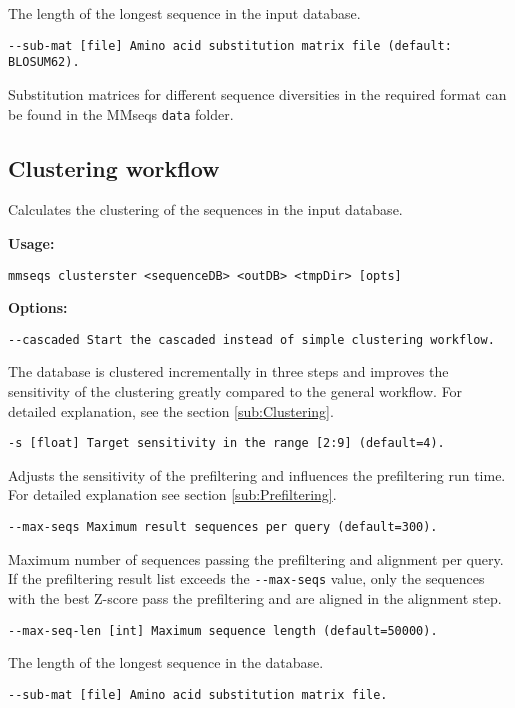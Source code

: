 \documentclass[11pt,a4paper]{report}
\begin{document}
The length of the longest sequence in the input database.

\texttt{\small -{}-sub-mat {[}file{]} Amino acid substitution matrix
file (default: BLOSUM62).}{\small \par}

Substitution matrices for different sequence diversities in the required
format can be found in the MMseqs \texttt{data} folder.


\subsection{Clustering workflow\label{sub:Clustering-workflow}}

Calculates the clustering of the sequences in the input database. 

\textbf{Usage:}

\texttt{mmseqs clusterster <sequenceDB> <outDB> <tmpDir> {[}opts{]}}

\textbf{Options:}

\texttt{\small -{}-cascaded Start the cascaded instead of simple clustering
workflow.}{\small \par}

The database is clustered incrementally in three steps and improves
the sensitivity of the clustering greatly compared to the general
workflow. For detailed explanation, see the section \ref{sub:Clustering}.

\texttt{\small -s {[}float{]} Target sensitivity in the range {[}2:9{]}
(default=4).}{\small \par}

Adjusts the sensitivity of the prefiltering and influences the prefiltering
run time. For detailed explanation see section \ref{sub:Prefiltering}.

\texttt{\small -{}-max-seqs Maximum result sequences per query (default=300).}{\small \par}

Maximum number of sequences passing the prefiltering and alignment
per query. If the prefiltering result list exceeds the \texttt{-{}-max-seqs}
value, only the sequences with the best Z-score pass the prefiltering
and are aligned in the alignment step.

\texttt{\small -{}-max-seq-len {[}int{]} Maximum sequence length (default=50000).}{\small \par}

The length of the longest sequence in the database.

\texttt{\small -{}-sub-mat {[}file{]} Amino acid substitution matrix
file.}{\small \par}
\end{document}
